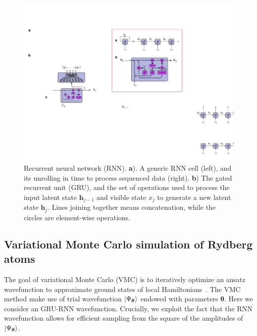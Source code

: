 \documentclass[twocolumn,english,reprint,superscriptaddress,longbibliography,pra]{revtex4-1}
\begin{document}
\begin{figure}[t]
\noindent \centering{}\includegraphics[width=\columnwidth]{rnn}
\caption{Recurrent neural network (RNN). {\bf a}). A generic RNN cell (left), and its unrolling in time to process sequenced data (right). {\bf b}) The gated recurrent unit (GRU), and the set of operations used to process the input latent state $\bm{h}_{j-1}$ and visible state $x_j$ to generate a new latent state $\bm{h}_j$. Lines joining together means concatenation, while the circles are element-wise operations.}
\label{Fig::rnn} 
\end{figure}

\subsection{Variational Monte Carlo simulation of Rydberg atoms}
The goal of variational Monte Carlo (VMC) is to iteratively optimize an ansatz wavefunction to approximate  ground states of local Hamiltonians~\cite{becca_sorella_2017}. The VMC method make use of trial wavefunction $\ket{\Psi_{\bm{\theta}}}$ endowed with parameters $\bm{\theta}$. Here we consider an GRU-RNN wavefunction. Crucially, we exploit the fact that the RNN wavefunction allows for efficient sampling from the square of the amplitudes of $\ket{\Psi_{\bm{\theta}}}$. 
\end{document}
